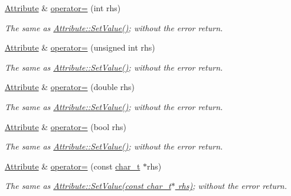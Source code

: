 \begin{DoxyCompactItemize}
\hyperlink{classphys_1_1xml_1_1Attribute}{Attribute} \& \hyperlink{classphys_1_1xml_1_1Attribute_ac9a18c2b6c4bfc0cdfe4eede938a91fe}{operator=} (int rhs)
\begin{DoxyCompactList}\small\item\em The same as \hyperlink{classphys_1_1xml_1_1Attribute_a470512fcd8b4f7609319bf85df100aaa}{Attribute::SetValue()}; without the error return. \item\end{DoxyCompactList}\item 
\hyperlink{classphys_1_1xml_1_1Attribute}{Attribute} \& \hyperlink{classphys_1_1xml_1_1Attribute_af6b6e5202b23be948b986cb0bcdf5da8}{operator=} (unsigned int rhs)
\begin{DoxyCompactList}\small\item\em The same as \hyperlink{classphys_1_1xml_1_1Attribute_a470512fcd8b4f7609319bf85df100aaa}{Attribute::SetValue()}; without the error return. \item\end{DoxyCompactList}\item 
\hyperlink{classphys_1_1xml_1_1Attribute}{Attribute} \& \hyperlink{classphys_1_1xml_1_1Attribute_ac92a92492d624984a52b64bc4fabf355}{operator=} (double rhs)
\begin{DoxyCompactList}\small\item\em The same as \hyperlink{classphys_1_1xml_1_1Attribute_a470512fcd8b4f7609319bf85df100aaa}{Attribute::SetValue()}; without the error return. \item\end{DoxyCompactList}\item 
\hyperlink{classphys_1_1xml_1_1Attribute}{Attribute} \& \hyperlink{classphys_1_1xml_1_1Attribute_a008397ad3c9c63bf27a4dca4b68e5efd}{operator=} (bool rhs)
\begin{DoxyCompactList}\small\item\em The same as \hyperlink{classphys_1_1xml_1_1Attribute_a470512fcd8b4f7609319bf85df100aaa}{Attribute::SetValue()}; without the error return. \item\end{DoxyCompactList}\item 
\hyperlink{classphys_1_1xml_1_1Attribute}{Attribute} \& \hyperlink{classphys_1_1xml_1_1Attribute_a78d7a0436d386040e2d1f8954304b25b}{operator=} (const \hyperlink{namespacephys_1_1xml_afc87705cd1c2917d87b879715a2d8f6e}{char\_\-t} $\ast$rhs)
\begin{DoxyCompactList}\small\item\em The same as \hyperlink{classphys_1_1xml_1_1Attribute_a470512fcd8b4f7609319bf85df100aaa}{Attribute::SetValue(const char\_\-t$\ast$ rhs)}; without the error return. \item\end{DoxyCompactList}\item 

\end{DoxyCompactItemize}
